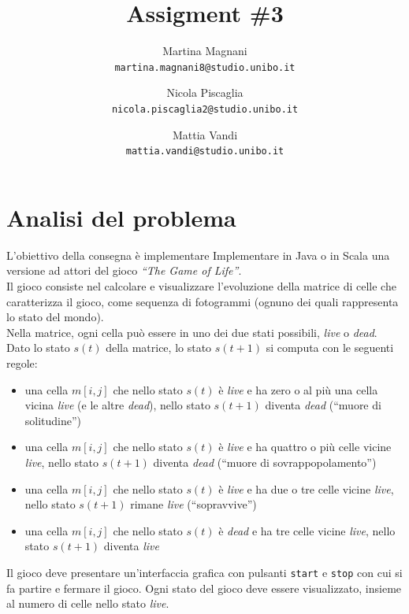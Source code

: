 \documentclass[a4paper]{article}
\title{\LARGE \bf
Assigment \#3
}
\author{
    Martina Magnani\\
    \texttt{martina.magnani8@studio.unibo.it}
    \and
    Nicola Piscaglia\\
    \texttt{nicola.piscaglia2@studio.unibo.it}
    \and
    Mattia Vandi\\
    \texttt{mattia.vandi@studio.unibo.it}
}
\date{}
\begin{document}
\maketitle

\section{Analisi del problema}\label{analisi-del-problema}

L'obiettivo della consegna è implementare Implementare in Java o in Scala una versione ad attori del gioco \textit{``The Game of Life''}.\\
Il gioco consiste nel calcolare e visualizzare l'evoluzione della matrice di celle che caratterizza il gioco, come sequenza di fotogrammi (ognuno dei quali rappresenta lo stato del mondo).\\
Nella matrice, ogni cella può essere in uno dei due stati possibili, \textit{live} o \textit{dead}.\\
Dato lo stato \(s\left(t\right)\) della matrice, lo stato \(s\left(t + 1\right)\) si computa con le seguenti regole:

\begin{itemize}
\item
  una cella \(m\left[i,j\right]\) che nello stato \(s\left(t\right)\) è \textit{live} e ha zero o al più una cella vicina \textit{live} (e le altre \textit{dead}), nello stato \(s\left(t + 1\right)\) diventa \textit{dead} (``muore di solitudine'')
\item
  una cella \(m\left[i,j\right]\) che nello stato \(s\left(t\right)\) è \textit{live} e ha quattro o più celle vicine \textit{live}, nello stato \(s\left(t + 1\right)\) diventa \textit{dead} (``muore di sovrappopolamento'')
\item
  una cella \(m\left[i,j\right]\) che nello stato \(s\left(t\right)\) è \textit{live} e ha due o tre celle vicine \textit{live}, nello stato \(s\left(t + 1\right)\) rimane \textit{live} (``sopravvive'')
\item
  una cella \(m\left[i,j\right]\) che nello stato \(s\left(t\right)\) è \textit{dead} e ha tre celle vicine \textit{live}, nello stato \(s\left(t + 1\right)\) diventa \textit{live}
\end{itemize}
Il gioco deve presentare un'interfaccia grafica con pulsanti \texttt{start} e \texttt{stop} con cui si fa partire e fermare il gioco.
Ogni stato del gioco deve essere visualizzato, insieme al numero di celle nello stato \textit{live}.
\end{document}
